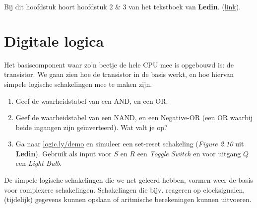 Bij dit hoofdstuk hoort hoofdstuk 2 \& 3 van het tekstboek van \textbf{Ledin}. (\href{https://learning.oreilly.com/library/view/modern-computer-architecture/9781803234519/Text/Chapter\_2.xhtml\#:-:text=2,Digital\%20Logic}{link}). 

\newpage
\section{Digitale logica}
Het basiscomponent waar zo'n beetje de hele CPU mee is opgebouwd is: de
transistor. We gaan zien hoe de transistor in de basis werkt, en hoe hiervan
simpele logische schakelingen mee te maken zijn.


\begin{opdracht}
  \begin{minipage}[t]{0.9\linewidth}
  \begin{enumerate}
      \item [A] Geef de waarheidstabel van een AND, en een OR.
      \item [B] Geef de waarheidstabel van een NAND, en een Negative-OR (een OR
        waarbij beide ingangen zijn geïnverteerd). Wat valt je op? 
      \item [C] Ga naar \href{https://logic.ly/demo}{logic.ly/demo} en simuleer
        een set-reset schakeling (\textit{Figure 2.10} uit \textbf{Ledin}). Gebruik als input voor
        $S$ en $R$ een \textit{Toggle Switch} en voor uitgang $Q$ een
        \textit{Light Bulb}. 
    \end{enumerate}
  \end{minipage}
\end{opdracht}

De simpele logische schakelingen die we net geleerd hebben, vormen weer de
basis voor complexere schakelingen. Schakelingen die bijv. reageren op
clocksignalen, (tijdelijk) gegevens kunnen opslaan of aritmische
berekeningen kunnen uitvoeren.


